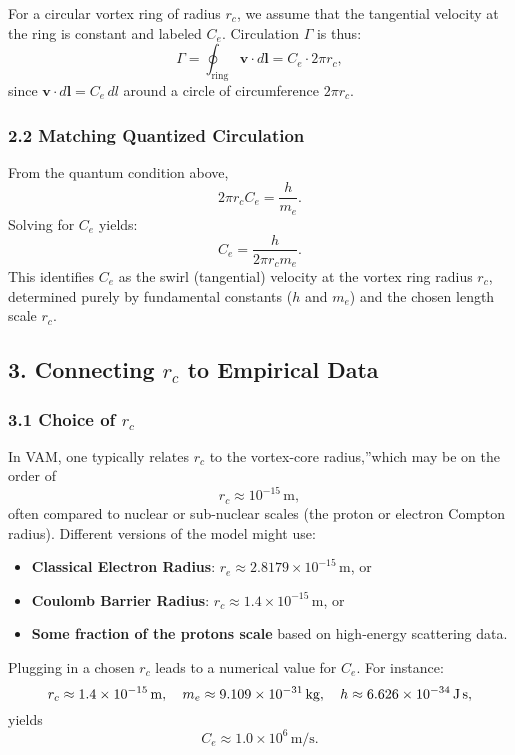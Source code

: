 For a circular vortex ring of radius \(r_c\), we assume that the tangential velocity at the ring is constant and labeled \(C_e\). Circulation \(\Gamma\) is thus:
\[
    \Gamma = \oint_\text{ring} \mathbf{v} \cdot d\mathbf{l} = C_e \cdot 2 \pi r_c,
\]
since \(\mathbf{v} \cdot d\mathbf{l} = C_e \,dl\) around a circle of circumference \(2\pi r_c\).

\subsubsection*{2.2 Matching Quantized Circulation}

From the quantum condition above,
\[
    2 \pi r_c C_e = \frac{h}{m_e}.
\]
Solving for \(C_e\) yields:
\[
    C_e = \frac{h}{2 \pi r_c m_e}.
\]
This identifies \(C_e\) as the swirl (tangential) velocity at the vortex ring radius \(r_c\), determined purely by fundamental constants (\(h\) and \(m_e\)) and the chosen length scale \(r_c\).

\subsection*{3. Connecting \(r_c\) to Empirical Data}

\subsubsection*{3.1 Choice of \(r_c\)}

In VAM, one typically relates \(r_c\) to the \grqq vortex-core radius,\textquotedblright which may be on the order of
\[
    r_c \approx 10^{-15}\,\text{m},
\]
often compared to nuclear or sub-nuclear scales (the proton or electron Compton radius). Different versions of the model might use:
\begin{itemize}
    \item \textbf{Classical Electron Radius}: \(r_e \approx 2.8179 \times 10^{-15}\,\mathrm{m}\), or
    \item \textbf{Coulomb Barrier Radius}: \(r_c \approx 1.4 \times 10^{-15}\,\mathrm{m}\), or
    \item \textbf{Some fraction of the proton\rqs s scale} based on high-energy scattering data.
\end{itemize}

Plugging in a chosen \(r_c\) leads to a numerical value for \(C_e\). For instance:
\[
    r_c \approx 1.4 \times 10^{-15}\,\text{m}, \quad m_e \approx 9.109 \times 10^{-31}\,\text{kg}, \quad h \approx 6.626 \times 10^{-34}\,\text{J\,s},
\]
yields
\[
    C_e \approx 1.0 \times 10^6 \,\text{m/s}.
\]

